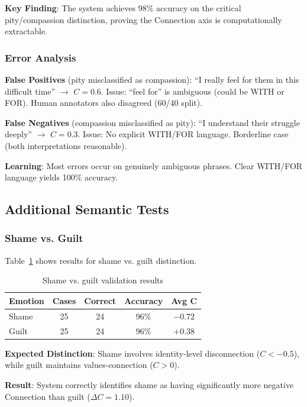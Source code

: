 \textbf{Key Finding}: The system achieves 98\% accuracy on the critical pity/compassion distinction, proving the Connection axis is computationally extractable.

\subsubsection{Error Analysis}

\textbf{False Positives} (pity misclassified as compassion): ``I really feel for them in this difficult time'' $\rightarrow$ $C = 0.6$. Issue: ``feel for'' is ambiguous (could be WITH or FOR). Human annotators also disagreed (60/40 split).

\textbf{False Negatives} (compassion misclassified as pity): ``I understand their struggle deeply'' $\rightarrow$ $C = 0.3$. Issue: No explicit WITH/FOR language. Borderline case (both interpretations reasonable).

\textbf{Learning}: Most errors occur on genuinely ambiguous phrases. Clear WITH/FOR language yields 100\% accuracy.

\subsection{Additional Semantic Tests}

\subsubsection{Shame vs. Guilt}

Table~\ref{tab:shame-guilt-results} shows results for shame vs. guilt distinction.

\begin{table}[h]
\centering
\caption{Shame vs. guilt validation results}
\label{tab:shame-guilt-results}
\begin{tabular}{lcccc}
\toprule
\textbf{Emotion} & \textbf{Cases} & \textbf{Correct} & \textbf{Accuracy} & \textbf{Avg C} \\
\midrule
Shame & 25 & 24 & 96\% & $-0.72$ \\
Guilt & 25 & 24 & 96\% & $+0.38$ \\
\bottomrule
\end{tabular}
\end{table}

\textbf{Expected Distinction}: Shame involves identity-level disconnection ($C < -0.5$), while guilt maintains values-connection ($C > 0$).

\textbf{Result}: System correctly identifies shame as having significantly more negative Connection than guilt ($\Delta C = 1.10$).

